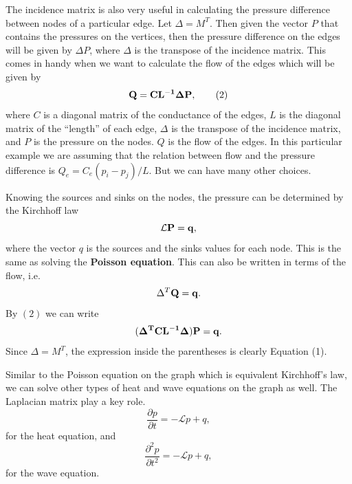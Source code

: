 \documentclass[10pt,a4paper,twocolumn]{article}
\begin{document}
	
	The incidence matrix is also very useful in calculating the pressure difference between nodes of a particular edge. Let $ \Delta = M^T $. Then given the vector $ P $ that contains the pressures on the vertices, then the pressure difference on the edges will be given by $ \Delta P $, where $ \Delta  $ is the transpose of the incidence matrix. This comes in handy when we want to calculate the flow of the edges which will be given by
	\[ \bf{Q} = \bf{C} L^{-1} \bf{\Delta} \bf{P}, \tag{2} \]
	where $ C $ is a diagonal matrix of the conductance of the edges, $ L $ is the diagonal matrix of the ``length'' of each edge, $ \Delta $ is the transpose of the incidence matrix, and $ P $ is the pressure on the nodes. $ Q $ is the flow of the edges. In this particular example we are assuming that the relation between flow and the pressure difference is $ Q_e = C_e (p_i - p_j)/L $. But we can have many other choices.
	
	Knowing the sources and sinks on the nodes, the pressure can be determined by the Kirchhoff law
	\[ \mathcal{L} \bf{P} = \bf{q}, \]
	where the vector $ q $ is the sources and the sinks values for each node. This is the same as solving the \textbf{Poisson equation}. This can also be written in terms of the flow, i.e.
	\[ \Delta^T \bf{Q} = \bf{q}. \] 
	By $ (2) $ we can write
	\[ (\bf{\Delta}^T \bf{C}\bf{L}^{-1}\Delta) \bf{P} = \bf{q}. \]
	Since $ \Delta = M^T $, the expression inside the parentheses is clearly Equation (1).
	
	Similar to the Poisson equation on the graph which is equivalent Kirchhoff's law, we can solve other types of heat and wave equations on the graph as well. The Laplacian matrix play a key role.
	\[ \frac{\partial p}{\partial t} = - \mathcal{L} p + q,  \] 
	for the heat equation, and
	\[ \frac{\partial^2 p}{\partial t^2} = -\mathcal{L}p + q, \]
	for the wave equation.
	
\end{document}

